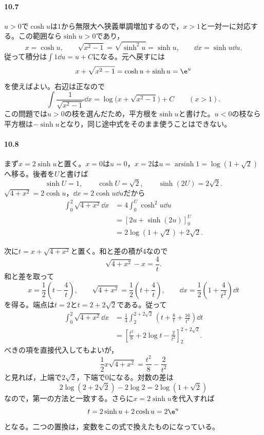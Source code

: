 \paragraph{10.7}
$u>0$で$\cosh u$は$1$から無限大へ狭義単調増加するので，$x>1$と一対一に対応する。この範囲なら$\sinh u>0$であり，
\[
x=\cosh u,\qquad
\sqrt{x^2-1}=\sqrt{\sinh^2u}=\sinh u,\qquad
\dd x=\sinh u\dd u.
\]
従って積分は$\int1\dd u=u+C$になる。元へ戻すには
\[
x+\sqrt{x^2-1}=\cosh u+\sinh u=\e^u
\]
を使えばよい。右辺は正なので
\[
\int\frac1{\sqrt{x^2-1}}\dd x
=\log\bigl(x+\sqrt{x^2-1}\bigr)+C\qquad(x>1).
\]
この問題では$u>0$の枝を選んだため，平方根を$\sinh u$と書けた。$u<0$の枝なら平方根は$-\sinh u$となり，同じ途中式をそのまま使うことはできない。

\paragraph{10.8}
まず$x=2\sinh u$と置く。$x=0$は$u=0$，$x=2$は$u=\operatorname{arsinh}1=\log(1+\sqrt2)$へ移る。後者を$U$と書けば
\[
\sinh U=1,\qquad\cosh U=\sqrt2,\qquad\sinh(2U)=2\sqrt2.
\]
$\sqrt{4+x^2}=2\cosh u$，$\dd x=2\cosh u\dd u$だから
\[
\begin{aligned}
\int_0^2\sqrt{4+x^2}\dd x
&=4\int_0^U\cosh^2u\dd u\\
&=\left[2u+\sinh(2u)\right]_0^U\\
&=2\log(1+\sqrt2)+2\sqrt2.
\end{aligned}
\]

次に$t=x+\sqrt{4+x^2}$と置く。和と差の積が$4$なので
\[
\sqrt{4+x^2}-x=\frac4t.
\]
和と差を取って
\[
x=\frac12\left(t-\frac4t\right),\qquad
\sqrt{4+x^2}=\frac12\left(t+\frac4t\right),\qquad
\dd x=\frac12\left(1+\frac4{t^2}\right)\dd t
\]
を得る。端点は$t=2$と$t=2+2\sqrt2$である。従って
\[
\begin{aligned}
\int_0^2\sqrt{4+x^2}\dd x
&=\frac14\int_2^{2+2\sqrt2}
 \left(t+\frac8t+\frac{16}{t^3}\right)\dd t\\
&=\left[\frac{t^2}{8}+2\log t-\frac2{t^2}\right]_2^{2+2\sqrt2}.
\end{aligned}
\]
べきの項を直接代入してもよいが，
\[
\frac12x\sqrt{4+x^2}=\frac{t^2}{8}-\frac2{t^2}
\]
と見れば，上端で$2\sqrt2$，下端で$0$になる。対数の差は
\[
2\log(2+2\sqrt2)-2\log2=2\log(1+\sqrt2)
\]
なので，第一の方法と一致する。さらに$x=2\sinh u$を代入すれば
\[
t=2\sinh u+2\cosh u=2\e^u
\]
となる。二つの置換は，変数をこの式で換えたものになっている。
